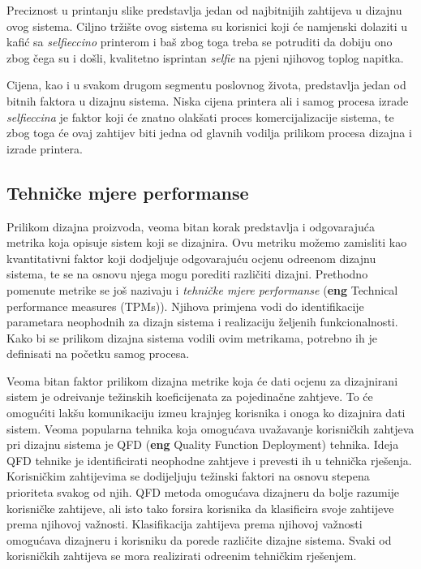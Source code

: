 \documentclass[12pt]{article}
\begin{document}
Preciznost u printanju slike predstavlja jedan od najbitnijih zahtijeva u dizajnu ovog sistema. Ciljno tr\v{z}i\v{s}te ovog sistema su korisnici koji \'ce namjenski dolaziti u kafi\'c sa \textit{selfieccino} printerom i ba\v{s} zbog toga treba se potruditi da dobiju ono zbog \v{c}ega su i do\v{s}li, kvalitetno isprintan \textit{selfie} na pjeni njihovog toplog napitka.

Cijena, kao i u svakom drugom segmentu poslovnog \v{z}ivota, predstavlja jedan od bitnih faktora u dizajnu sistema. Niska cijena printera  ali i samog procesa izrade \textit{selfieccina} je faktor koji \'ce znatno olak\v{s}ati proces komercijalizacije sistema, te zbog toga \'ce ovaj zahtijev biti jedna od glavnih vodilja prilikom procesa dizajna i izrade printera.
 
\subsection{Tehni\v{c}ke mjere performanse} 

Prilikom dizajna proizvoda, veoma bitan korak predstavlja i odgovaraju\'ca metrika koja opisuje sistem koji se dizajnira. Ovu metriku mo\v{z}emo zamisliti kao kvantitativni faktor koji dodjeljuje odgovaraju\'cu ocjenu odre\dj enom dizajnu sistema, te se na osnovu njega mogu porediti razli\v{c}iti dizajni. Prethodno pomenute metrike se jo\v{s} nazivaju i \textit{tehni\v{c}ke mjere performanse} (\textbf{eng} Technical performance measures (TPMs)). Njihova primjena vodi do identifikacije parametara neophodnih za dizajn sistema i realizaciju \v{z}eljenih funkcionalnosti. Kako bi se prilikom dizajna sistema vodili ovim metrikama, potrebno ih je definisati na po\v{c}etku samog procesa. 

Veoma bitan faktor prilikom dizajna metrike koja \'ce dati ocjenu za dizajnirani sistem je odre\dj ivanje te\v{z}inskih koeficijenata za pojedina\v{c}ne zahtjeve. To \'ce omogu\'citi lak\v{s}u komunikaciju izme\dj u krajnjeg korisnika i onoga ko dizajnira dati sistem. Veoma popularna tehnika koja omogu\'cava uva\v{z}avanje korisni\v{c}kih zahtjeva pri dizajnu sistema je QFD (\textbf{eng} Quality Function Deployment) tehnika. Ideja QFD tehnike je identificirati neophodne zahtjeve i prevesti ih u tehni\v{c}ka rje\v{s}enja. Korisni\v{c}kim zahtijevima se dodijeljuju te\v{z}inski faktori na osnovu stepena prioriteta svakog od njih. QFD metoda omogu\'cava dizajneru da bolje razumije korisni\v{c}ke zahtijeve, ali isto tako forsira korisnika da klasificira svoje zahtijeve prema njihovoj va\v{z}nosti. Klasifikacija zahtijeva prema njihovoj va\v{z}nosti omogu\'cava dizajneru i korisniku da porede razli\v{c}ite dizajne sistema. Svaki od korisni\v{c}kih zahtijeva se mora realizirati odre\dj enim tehni\v{c}kim rje\v{s}enjem. 
\end{document}
